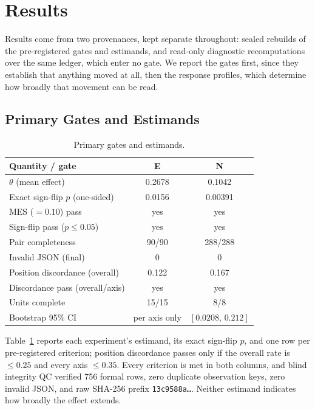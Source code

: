 \documentclass[sigconf]{acmart}
\begin{document}
\section{Results}

Results come from two provenances, kept separate throughout: sealed rebuilds of the pre-registered gates and estimands, and read-only diagnostic recomputations over the same ledger, which enter no gate. We report the gates first, since they establish that anything moved at all, then the response profiles, which determine how broadly that movement can be read.

\subsection{Primary Gates and Estimands}

\begin{table}[H]
  \caption{Primary gates and estimands.}
  \label{tab:primary}
  \centering
  \small
  \setlength{\tabcolsep}{3.2pt}
  \begin{tabular}{@{}lcc@{}}
    \toprule
    Quantity / gate & E & N \\
    \midrule
    $\theta$ (mean effect) & 0.2678 & 0.1042 \\
    Exact sign-flip $p$ (one-sided) & 0.0156 & 0.00391 \\
    MES (${=}0.10$) pass & yes & yes \\
    Sign-flip pass ($p\leq0.05$) & yes & yes \\
    Pair completeness & 90/90 & 288/288 \\
    Invalid JSON (final) & 0 & 0 \\
    Position discordance (overall) & 0.122 & 0.167 \\
    Discordance pass (overall/axis) & yes & yes \\
    Units complete & 15/15 & 8/8 \\
    Bootstrap 95\% CI & per axis only & $[0.0208,\,0.212]$ \\
    \bottomrule
  \end{tabular}
\end{table}

Table~\ref{tab:primary} reports each experiment's estimand, its exact sign-flip $p$, and one row per pre-registered criterion; position discordance passes only if the overall rate is ${\leq}0.25$ and every axis ${\leq}0.35$. Every criterion is met in both columns, and blind integrity QC verified 756 formal rows, zero duplicate observation keys, zero invalid JSON, and raw SHA-256 prefix \texttt{13c9588a\ldots}. Neither estimand indicates how broadly the effect extends.
\end{document}
